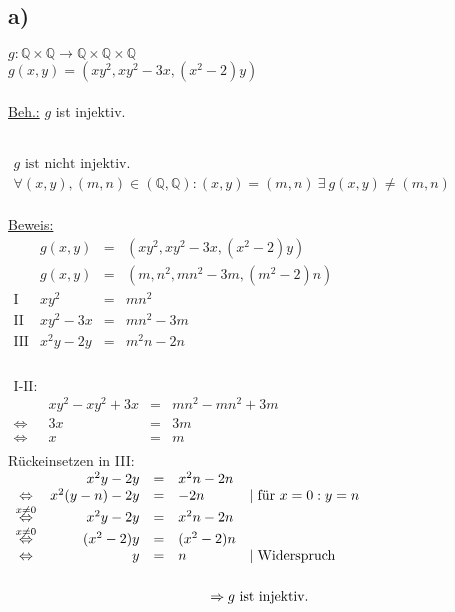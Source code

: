 \documentclass[a4paper]{scrartcl}
\begin{document}
	\subsection{a)}
		\(g: \mathbb{Q}\times\mathbb{Q}\rightarrow\mathbb{Q}\times\mathbb{Q}\times\mathbb{Q}\) \\
		\(g(x,y) = (xy^2,xy^2-3x,(x^2-2)y)\) \\ \\
		\underline{Beh.:} \(g\) ist injektiv. 
		\begin{flushleft}
		 \\
		\(
		\begin{array}{ll}
			g \text{ ist nicht injektiv.} \\
			\forall (x,y),(m,n)\in (\mathbb{Q},\mathbb{Q}): (x,y) = (m,n)\ \exists\ g(x,y)\neq 
			(m,n)\\
		\end{array}
		\)
		\end{flushleft}		
		\underline{Beweis:} \\
		\(
		\begin{array}{lrcll}
			&g(x,y)&=&(xy^2,xy^2-3x,(x^2-2)y) \\
			&g(x,y)&=&(m,n^2,mn^2-3m,(m^2-2)n) \\
			\text{I}&xy^2&=&mn^2 \\
			\text{II}&xy^2-3x&=&mn^2-3m \\
			\text{III}&x^2y-2y&=&m^2n-2n \\ 
		\end{array}
		\)\\ \\
		\(
		\begin{array}{rrcll}
		\text{I-II:}&\\
		&xy^2-xy^2+3x&=&mn^2-mn^2+3m \\
		\Leftrightarrow &3x&=&3m \\
		\Leftrightarrow & x&=&m \\
		\end{array}			
		\) \\
		\newline
		Rückeinsetzen in III: \\
		\(
		\begin{array}{crcll}
			&x^2y-2y&=&x^2n-2n \\
			\Leftrightarrow & x^2(y-n)-2y&=&-2n &\mid \text{für }x=0:y=n \\
			\overset{x\neq 0}{\Leftrightarrow}& x^2y-2y&=&x^2n-2n \\
			\overset{x\neq 0}{\Leftrightarrow}& (x^2-2)y &=& (x^2-2)n \\
			\Leftrightarrow & y&=&n &\mid \text{Widerspruch} \\ \\
		\end{array} \\ \\ \)
		\[
		\Rightarrow g \text{ ist injektiv.} \\
		\]
		
\end{document}
